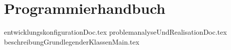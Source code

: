 \part{Programmierhandbuch}
{entwicklungskonfigurationDoc.tex}
{problemanalyseUndRealisationDoc.tex}
{beschreibungGrundlegenderKlassenMain.tex}

